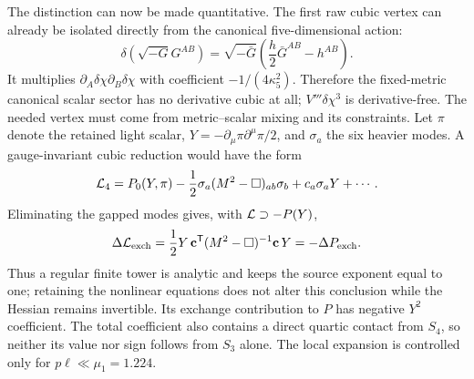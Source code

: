 \documentclass[10pt]{article}
\begin{document}
The distinction can now be made quantitative.  The first raw cubic vertex can
already be isolated directly from the canonical five-dimensional action:
\begin{equation}
 \delta(\sqrt{-G}G^{AB})=\sqrt{-\bar G}
 \left(\frac h2\bar G^{AB}-h^{AB}\right).
 \label{eq:densitizedinversevariation}
\end{equation}
It multiplies $\partial_A\delta\chi\partial_B\delta\chi$ with coefficient
$-1/(4\kappa_5^2)$.  Therefore the fixed-metric canonical scalar sector has no
derivative cubic at all; $V'''\delta\chi^3$ is derivative-free.  The needed
vertex must come from metric--scalar mixing and its constraints.  Let $\pi$
denote the retained light scalar, $Y=-\partial_\mu\pi\partial^\mu\pi/2$, and
$\sigma_a$ the six heavier modes.  A gauge-invariant cubic reduction would have
the form
\begin{equation}
 {\cal L}_4=P_0(Y,\pi)-\frac12\sigma_a(M^2-\Box)_{ab}\sigma_b
 +c_a\sigma_aY+\cdots .
 \label{eq:bulkcubicreduction}
\end{equation}
Eliminating the gapped modes gives, with ${\cal L}\supset-P(Y)$,
\begin{equation}
 \Delta{\cal L}_{\rm exch}=\frac12Y\,\mathbf c^{\mathsf T}
 (M^2-\Box)^{-1}\mathbf c\,Y=-\Delta P_{\rm exch}.
 \label{eq:gappedanalyticresponse}
\end{equation}
Thus a regular finite tower is analytic and keeps the source exponent equal to
one; retaining the nonlinear equations does not alter this conclusion while
the Hessian remains invertible.  Its exchange contribution to $P$ has negative
$Y^2$ coefficient.  The total coefficient also contains a direct quartic
contact from $S_4$, so neither its value nor sign follows from $S_3$ alone.  The
local expansion is controlled only for $p\ell\ll\mu_1=1.224$.
\end{document}
